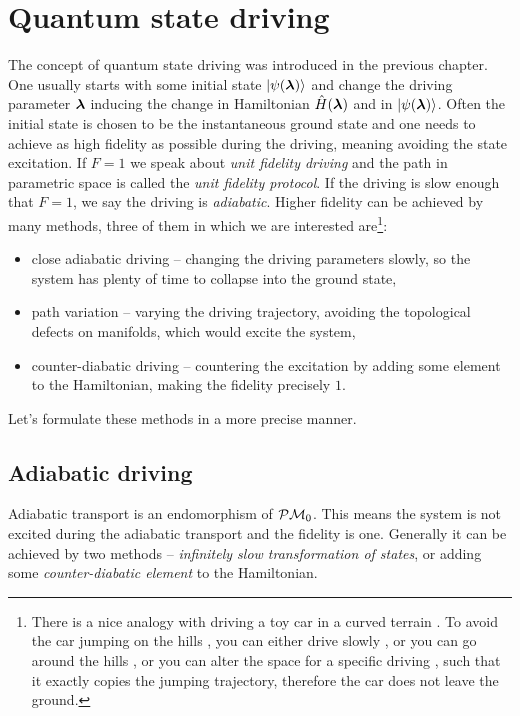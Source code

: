 \chapter{Quantum state driving}
\label{chap:typesOfDriving}
The concept of quantum state driving was introduced in the previous chapter. One usually starts with some initial state $\ket{\psi({\bm\lambda})}$ and change the driving parameter ${\bm\lambda}$ inducing the change in Hamiltonian $\hat{H}({\bm\lambda})$ and in $\ket{\psi({\bm\lambda})}$. Often the initial state is chosen to be the instantaneous ground state and one needs to achieve as high fidelity as possible during the driving, meaning avoiding the state excitation. If $F=1$ we speak about \emph{unit fidelity driving} and the path in parametric space is called the \emph{unit fidelity protocol}. If the driving is slow enough that $F=1$, we say the driving is \emph{adiabatic}. Higher fidelity can be achieved by many methods, three of them in which we are interested are\footnote{There is a nice analogy with driving a toy car  in a curved terrain . To avoid the car jumping on the hills , you can either drive slowly , or you can go around the hills , or you can alter the space for a specific driving , such that it exactly copies the jumping trajectory, therefore the car does not leave the ground.}:
\begin{itemize}
    \item close adiabatic driving -- changing the driving parameters slowly, so the system has plenty of time to collapse into the ground state,
    \item path variation -- varying the driving trajectory, avoiding the topological defects on manifolds, which would excite the system,
    \item counter-diabatic driving -- countering the excitation by adding some element to the Hamiltonian, making the fidelity precisely $1$.
\end{itemize}

Let's formulate these methods in a more precise manner.

\section{Adiabatic driving}
Adiabatic transport is an endomorphism of $\mathcal{P}\mathcal{M} _0$. This means the system is not excited during the adiabatic transport and the fidelity is one. Generally it can be achieved by two methods -- \emph{infinitely slow transformation of states}, or adding some \emph{counter-diabatic element} to the Hamiltonian.


